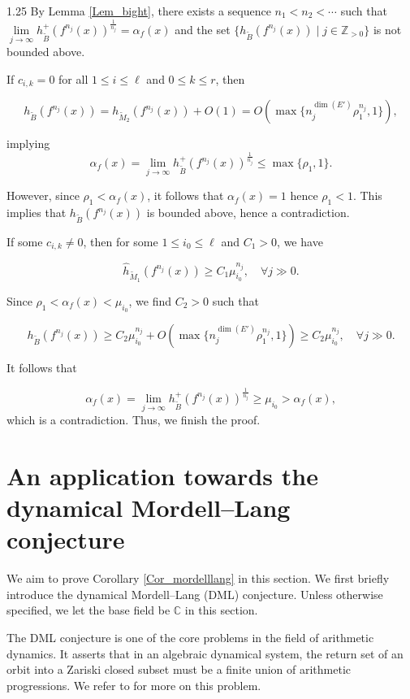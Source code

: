 \documentclass[12pt]{amsart}
\newcommand{\mb}[1]{\mathbb{#1}}
\newcommand\ra{\rightarrow}
\newcommand\wt{\widetilde}
\begin{document}
\begin{spacing}{1.25}
By Lemma \ref{Lem_bight}, there exists a sequence $n_1<n_2<\cdots$ such that $\lim\limits_{j\ra\infty}h_{\wt{B}}^+(f^{n_j}(x))^{\frac{1}{n_j}}=\alpha_f(x)$ and the set $\{h_{\wt{B}}(f^{n_j}(x))\mid j\in \mb{Z}_{>0}\}$ is not bounded above.

If $c_{i,k}=0$ for all $1\leq i\leq \ell$ and $0\leq k\leq r$, then

\[h_{\wt{B}}(f^{n_j}(x))=h_{\wt{M}_2}(f^{n_j}(x))+O(1)=O(\max\{n_j^{\dim(E')}\rho_1^{n_j},1\}),\]

implying
\[\alpha_f(x)=\lim\limits_{j\ra\infty}h_{\wt{B}}^+(f^{n_j}(x))^{\frac{1}{n_j}}\leq \max\{\rho_1,1\}.\]

However, since $\rho_1<\alpha_f(x)$, it follows that $\alpha_f(x)=1$ hence $\rho_1<1$. This implies that $h_{\wt{B}}(f^{n_j}(x))$ is bounded above, hence a contradiction.

If some $c_{i,k}\neq 0$, then for some $1\leq i_0\leq \ell$ and $C_1>0$, we have

\[\widehat{h}_{\wt{M}_1}(f^{n_j}(x))\geq C_1\mu_{i_0}^{n_j},\quad \forall j\gg0.\]

 Since $\rho_1<\alpha_f(x)<\mu_{i_0}$, we find $C_2>0$ such that 

 \[h_{\wt{B}}(f^{n_j}(x))\geq C_2\mu_{i_0}^{n_j}+O(\max\{n_j^{\dim(E')}\rho_1^{n_j},1\})\geq C_2\mu_{i_0}^{n_j},\quad \forall j\gg0.\]

 It follows that

 \[\alpha_f(x)=\lim\limits_{j\ra\infty}h_{\wt{B}}^+(f^{n_j}(x))^{\frac{1}{n_j}}\geq\mu_{i_0}>\alpha_f(x),\]
 which is a contradiction. Thus, we finish the proof.
\endproof










\section{An application towards the dynamical Mordell--Lang conjecture}\label{Sec_app}

We aim to prove Corollary \ref{Cor_mordelllang} in this section. We first briefly introduce the dynamical Mordell--Lang (DML) conjecture. Unless otherwise specified, we let the base field be $\mb{C}$ in this section.

The DML conjecture is one of the core problems in the field of arithmetic dynamics. It asserts that in an algebraic dynamical system, the return set of an orbit into a Zariski closed subset must be a finite union of arithmetic progressions. We refer to \cite{BGT16,xieDML} for more on this problem.


\end{spacing}
\end{document}
